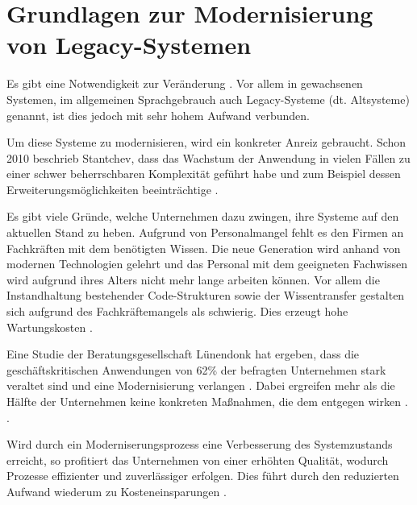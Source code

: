 \section{Grundlagen zur Modernisierung von Legacy-Systemen}
\label{ch:SdF:Legacy}

Es gibt eine \glqq Notwendigkeit zur Veränderung\grqq{} \cite{FlorianStocker:2024}. Vor allem in gewachsenen Systemen, im allgemeinen Sprachgebrauch auch Legacy-Systeme (dt. Altsysteme) genannt, ist dies jedoch mit sehr hohem Aufwand verbunden.

Um diese Systeme zu modernisieren, wird ein konkreter Anreiz gebraucht. Schon 2010 beschrieb Stantchev, dass das Wachstum der Anwendung in vielen Fällen zu einer schwer beherrschbaren Komplexität geführt habe und zum Beispiel dessen Erweiterungsmöglichkeiten beeinträchtige \cites[S. 19]{Stantchev:2010}{FlorianStocker:2024}.

Es gibt viele Gründe, welche Unternehmen dazu zwingen, ihre Systeme auf den aktuellen Stand zu heben. 
Aufgrund von Personalmangel fehlt es den Firmen an Fachkräften mit dem benötigten Wissen. Die neue Generation wird anhand von modernen Technologien gelehrt und das Personal mit dem geeigneten Fachwissen wird aufgrund ihres Alters nicht mehr lange arbeiten können. Vor allem die Instandhaltung bestehender Code-Strukturen sowie der Wissentransfer gestalten sich aufgrund des Fachkräftemangels als schwierig. Dies erzeugt hohe Wartungskosten \cite{Hille:2024}.

Eine Studie der Beratungsgesellschaft Lünendonk hat ergeben, dass die geschäftskritischen Anwendungen von 62\% der befragten Unternehmen stark veraltet sind und eine Modernisierung verlangen \cite{AxelKannenberg:2025}. Dabei ergreifen mehr als die Hälfte der Unternehmen keine konkreten Maßnahmen, die dem entgegen wirken \cite[S. 4]{Stantchev:2010}. \cites{AxelKannenberg:2025}{FlorianStocker:2024}[S. 4]{Stantchev:2010}.

Wird durch ein Moderniserungsprozess eine Verbesserung des Systemzustands erreicht, so profitiert das Unternehmen von einer erhöhten Qualität, wodurch Prozesse effizienter und zuverlässiger erfolgen. Dies führt durch den reduzierten Aufwand wiederum zu Kosteneinsparungen \cite[S. 16]{Oppel:2025}.



